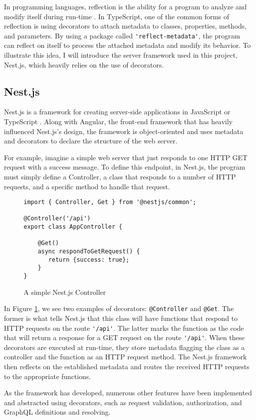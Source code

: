 In programming languages, reflection is the ability for a program to analyze and modify itself during run-time \cite{malenfantTutorialBehavioralReflection1996}.  In TypeScript, one of the common forms of reflection is using decorators to attach metadata to classes, properties, methods, and parameters.  By using a package called \Verb!'reflect-metadata'!, the program can reflect on itself to process the attached metadata and modify its behavior.  To illustrate this idea, I will introduce the server framework used in this project, Nest.js, which heavily relies on the use of decorators.

\subsection{Nest.js} \label{sec:nest-js}
Nest.js is a framework for creating server-side applications in JavaScript or TypeScript \cite{mysliwiecDocumentation2019}.  Along with Angular, the front-end framework that has heavily influenced Nest.js's design, the framework is object-oriented and uses metadata and decorators to declare the structure of the web server.

For example, imagine a simple web server that just responds to one HTTP GET request with a success message.  To define this endpoint, in Nest.js, the program must simply define a Controller, a class that responds to a number of HTTP requests, and a specific method to handle that request.

\begin{figure}
    \begin{verbatim}
import { Controller, Get } from '@nestjs/common';

@Controller('/api')
export class AppController {

    @Get()
    async respondToGetRequest() {
       return {success: true};
    }
}
    \end{verbatim}
    \caption{A simple Nest.js Controller}
    \label{fig:nest-controller}
\end{figure}

In Figure \ref{fig:nest-controller}, we see two examples of decorators: \Verb!@Controller! and \Verb!@Get!.  The former is what tells Nest.js that this class will have functions that respond to HTTP requests on the route \Verb!'/api'!.  The latter marks the function as the code that will return a response for a GET request on the route \Verb!'/api'!.  When these decorators are executed at run-time, they store metadata flagging the class as a controller and the function as an HTTP request method.  The Nest.js framework then reflects on the established metadata and routes the received HTTP requests to the appropriate functions.

As the framework has developed, numerous other features have been implemented and abstracted using decorators, such as request validation, authorization, and GraphQL definitions and resolving.